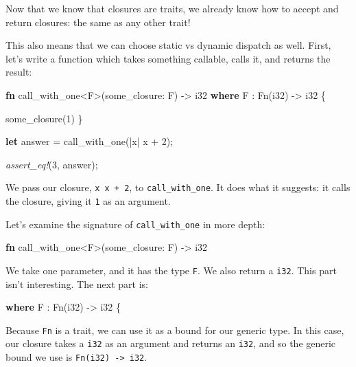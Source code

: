 \documentclass[a4paper,]{book}
\newenvironment{Shaded}{\begin{snugshade}}{\end{snugshade}}
\newcommand{\KeywordTok}[1]{\textcolor[rgb]{0.13,0.29,0.53}{\textbf{{#1}}}}
\newcommand{\DataTypeTok}[1]{\textcolor[rgb]{0.13,0.29,0.53}{{#1}}}
\newcommand{\DecValTok}[1]{\textcolor[rgb]{0.00,0.00,0.81}{{#1}}}
\newcommand{\BuiltInTok}[1]{{#1}}
\newcommand{\PreprocessorTok}[1]{\textcolor[rgb]{0.56,0.35,0.01}{\textit{{#1}}}}
\newcommand{\NormalTok}[1]{{#1}}
\begin{document}
Now that we know that closures are traits, we already know how to accept
and return closures: the same as any other trait!

This also means that we can choose static vs dynamic dispatch as well.
First, let's write a function which takes something callable, calls it,
and returns the result:

\begin{Shaded}
\begin{Highlighting}[]
\KeywordTok{fn} \NormalTok{call_with_one<F>(some_closure: F) -> }\DataTypeTok{i32}
    \KeywordTok{where} \NormalTok{F : }\BuiltInTok{Fn}\NormalTok{(}\DataTypeTok{i32}\NormalTok{) -> }\DataTypeTok{i32} \NormalTok{\{}

    \NormalTok{some_closure(}\DecValTok{1}\NormalTok{)}
\NormalTok{\}}

\KeywordTok{let} \NormalTok{answer = call_with_one(|x| x + }\DecValTok{2}\NormalTok{);}

\PreprocessorTok{assert_eq!}\NormalTok{(}\DecValTok{3}\NormalTok{, answer);}
\end{Highlighting}
\end{Shaded}

We pass our closure, \texttt{\textbar{}x\textbar{}\ x\ +\ 2}, to
\texttt{call\_with\_one}. It does what it suggests: it calls the
closure, giving it \texttt{1} as an argument.

Let's examine the signature of \texttt{call\_with\_one} in more depth:

\begin{Shaded}
\begin{Highlighting}[]
\KeywordTok{fn} \NormalTok{call_with_one<F>(some_closure: F) -> }\DataTypeTok{i32}
\end{Highlighting}
\end{Shaded}

We take one parameter, and it has the type \texttt{F}. We also return a
\texttt{i32}. This part isn't interesting. The next part is:

\begin{Shaded}
\begin{Highlighting}[]
    \KeywordTok{where} \NormalTok{F : }\BuiltInTok{Fn}\NormalTok{(}\DataTypeTok{i32}\NormalTok{) -> }\DataTypeTok{i32} \NormalTok{\{}
\end{Highlighting}
\end{Shaded}

Because \texttt{Fn} is a trait, we can use it as a bound for our generic
type. In this case, our closure takes a \texttt{i32} as an argument and
returns an \texttt{i32}, and so the generic bound we use is
\texttt{Fn(i32)\ -\textgreater{}\ i32}.
\end{document}
